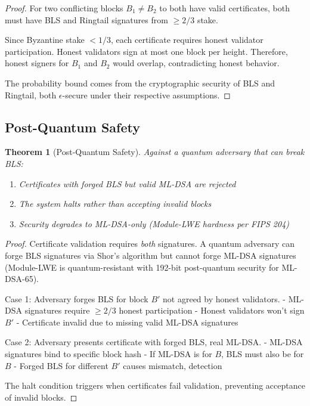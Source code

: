 \documentclass[11pt,a4paper]{article}
\newtheorem{theorem}{Theorem}
\begin{document}
\begin{proof}
For two conflicting blocks $B_1 \neq B_2$ to both have valid certificates, both must have BLS and Ringtail signatures from $\geq 2/3$ stake.

Since Byzantine stake $< 1/3$, each certificate requires honest validator participation. Honest validators sign at most one block per height. Therefore, honest signers for $B_1$ and $B_2$ would overlap, contradicting honest behavior.

The probability bound comes from the cryptographic security of BLS and Ringtail, both $\epsilon$-secure under their respective assumptions.
\end{proof}

\subsection{Post-Quantum Safety}

\begin{theorem}[Post-Quantum Safety]
\label{thm:postquantum}
Against a quantum adversary that can break BLS:
\begin{enumerate}
    \item Certificates with forged BLS but valid ML-DSA are rejected
    \item The system halts rather than accepting invalid blocks
    \item Security degrades to ML-DSA-only (Module-LWE hardness per FIPS 204)
\end{enumerate}
\end{theorem}

\begin{proof}
Certificate validation requires \emph{both} signatures. A quantum adversary can forge BLS signatures via Shor's algorithm but cannot forge ML-DSA signatures (Module-LWE is quantum-resistant with 192-bit post-quantum security for ML-DSA-65).

Case 1: Adversary forges BLS for block $B'$ not agreed by honest validators.
- ML-DSA signatures require $\geq 2/3$ honest participation
- Honest validators won't sign $B'$
- Certificate invalid due to missing valid ML-DSA signatures

Case 2: Adversary presents certificate with forged BLS, real ML-DSA.
- ML-DSA signatures bind to specific block hash
- If ML-DSA is for $B$, BLS must also be for $B$
- Forged BLS for different $B'$ causes mismatch, detection

The halt condition triggers when certificates fail validation, preventing acceptance of invalid blocks.
\end{proof}
\end{document}
